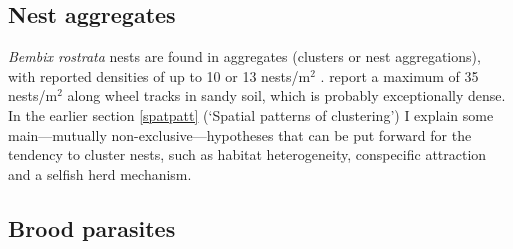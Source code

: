 \documentclass[10pt, twoside]{book} %
\begin{document}
	\subsection{Nest aggregates}
	\textit{Bembix rostrata} nests are found in aggregates (clusters or nest aggregations), with reported densities of up to 10 or 13 nests/m$^2$ \citep{nielsen1945, larsson1986}. \citet{schone1981} report a maximum of 35 nests/m$^2$ along wheel tracks in sandy soil, which is probably exceptionally dense. In the earlier section \ref{spatpatt} (`Spatial patterns of clustering') I explain some main---mutually non-exclusive---hypotheses that can be put forward for the tendency to cluster nests, such as habitat heterogeneity, conspecific attraction and a selfish herd mechanism.\\
	
	\subsection{Brood parasites}\label{broodpar}
\end{document}
